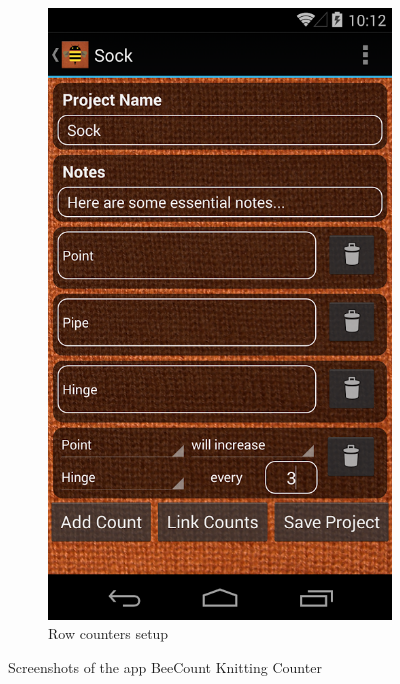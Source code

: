 \begin{figure}[H]
\begin{subfigure}[b]{0.33\textwidth}
        \includegraphics[width=0.95\linewidth]{images/image07.png}
        \caption[Row counters setup ]{Row counters setup}
      \label{fig:row_counters_setup}
    \end{subfigure}
  \caption[Screenshots of the app BeeCount Knitting Counter ]{Screenshots of the app BeeCount Knitting Counter}
\end{figure}

